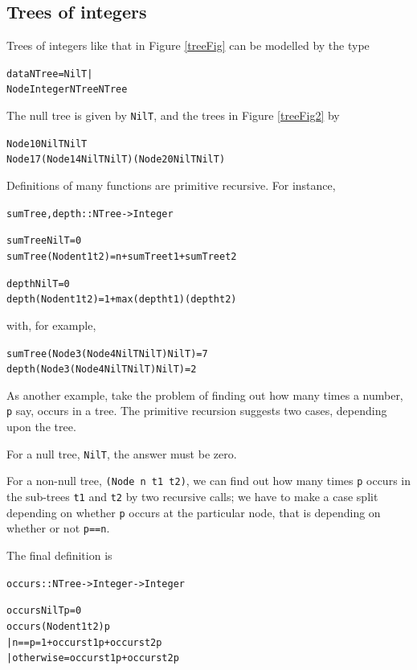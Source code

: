 \subsection*{Trees of integers}

Trees of integers like that in Figure \ref{treeFig} can be modelled by the type
\begin{alltt}
data NTree = NilT |
             Node Integer NTree NTree
\end{alltt}
The null tree is given by \texttt{NilT}, and the trees in Figure \ref{treeFig2}
by
\begin{alltt}
Node 10 NilT NilT
Node 17 (Node 14 NilT NilT) (Node 20 NilT NilT)
\end{alltt}
Definitions of many functions are primitive recursive. For instance,
\begin{alltt}
sumTree,depth :: NTree -> Integer

sumTree NilT           = 0
sumTree (Node n t1 t2) = n + sumTree t1 + sumTree t2

depth NilT             = 0
depth (Node n t1 t2)   = 1 + max (depth t1) (depth t2)
\end{alltt}
with, for example,
\begin{alltt}
sumTree (Node 3 (Node 4 NilT NilT) NilT) = 7
depth   (Node 3 (Node 4 NilT NilT) NilT) = 2
\end{alltt}
As another example, take the problem of finding out how many times a number,
\texttt{p} say, occurs in a tree. The primitive recursion suggests two cases,
depending upon the tree.
\begin{titemize} 
\item For a null tree, \texttt{NilT}, the answer must be zero.
\item For a non-null tree, \texttt{(Node n t1 t2)}, we can find out how many
times \texttt{p} occurs in the sub-trees \texttt{t1} and \texttt{t2} by two recursive
calls; we have to make a case split depending on whether \texttt{p} occurs at the
particular node, that is depending on whether or not \texttt{p==n}. 
\end{titemize}
The final definition is 
\begin{alltt}
occurs :: NTree -> Integer -> Integer

occurs NilT p = 0
occurs (Node n t1 t2) p
  | n==p        = 1 + occurs t1 p + occurs t2 p
  | otherwise   =     occurs t1 p + occurs t2 p
\end{alltt}

